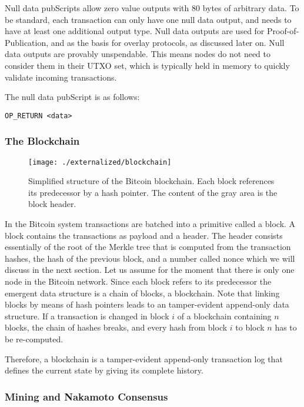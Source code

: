 Null data pubScripts allow zero value outputs with 80 bytes of arbitrary data. To be standard, each transaction can only have one null data output, and needs to have at least one additional output type. Null data outputs are used for Proof-of-Publication, and as the basis for overlay protocols, as discussed later on. Null data outputs are provably unspendable. This means nodes do not need to consider them in their UTXO set, which is typically held in memory to quickly validate incoming transactions. 

The null data pubScript is as follows:
\begin{lstlisting}
OP_RETURN <data>
\end{lstlisting}

\subsubsection{The Blockchain}
\label{sec:blockchain}

 \begin{figure*}[!t]
    \centering
    \texttt{[image: ./externalized/blockchain]}
    \caption{Simplified structure of the Bitcoin blockchain. Each block references its predecessor by a hash pointer. The content of the gray area is the block header.}
    \label{fig:blockchain}
  \end{figure*}

In the Bitcoin system transactions are batched into a primitive called a block. A block contains the transactions as payload and a header. The header consists essentially of the root of the Merkle tree that is computed from the transaction hashes, the hash of the previous block, and a number called nonce which we will discuss in the next section. Let us assume for the moment that there is only one node in the Bitcoin network. Since each block refers to its predecessor the emergent data structure is a chain of blocks, a blockchain. Note that linking blocks by means of hash pointers leads to an tamper-evident append-only data structure. If a transaction is changed in block $i$ of a blockchain containing $n$ blocks, the chain of hashes breaks, and every hash from block $i$ to block $n$ has to be re-computed.

Therefore, a blockchain is a tamper-evident append-only transaction log that defines the current state by giving its complete history.

\subsubsection{Mining and Nakamoto Consensus}
\label{sec:mining}

